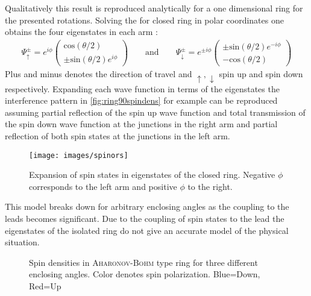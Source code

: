 Qualitatively this result is reproduced analytically for a one dimensional ring for the presented rotations. Solving the \hamil{} for closed ring in polar coordinates one obtains the four eigenstates in each arm \cite{nitta1999.695}:
\begin{align}
\Psi^{\pm}_{\uparrow} = e^{i\phi}\begin{pmatrix}\text{cos}(\theta/2)\\\pm\text{sin}(\theta/2)e^{i\phi}\end{pmatrix} 
\qquad\text{and}\qquad
\Psi^{\pm}_{\downarrow} = e^{\pm i\phi}\begin{pmatrix}\pm\text{sin}(\theta/2)e^{-i\phi}\\-\text{cos}(\theta/2)\end{pmatrix}
\end{align}
Plus and minus denotes the direction of travel and $\uparrow,\downarrow$ spin up and spin down respectively. Expanding each wave function in terms of the eigenstates the interference pattern in \cref{fig:ring90spindens} for example can be reproduced assuming partial reflection of the spin up wave function and total transmission of the spin down wave function at the junctions in the right arm and partial reflection of both spin states at the junctions in the left arm. 
\begin{figure}[!h]
\centering
\texttt{[image: images/spinors]}
\caption{Expansion of spin states in eigenstates of the closed ring. Negative $\phi$ corresponds to the left arm and positive $\phi$ to the right.}
\end{figure}
This model breaks down for arbitrary enclosing angles as the coupling to the leads becomes significant. Due to the coupling of spin states to the lead the eigenstates of the isolated ring do not give an accurate model of the physical situation.
\begin{figure}[h!]
\caption{Spin densities in \textsc{Aharonov-Bohm} type ring for three different enclosing angles. Color denotes spin polarization. Blue=Down, Red=Up}
\end{figure}

